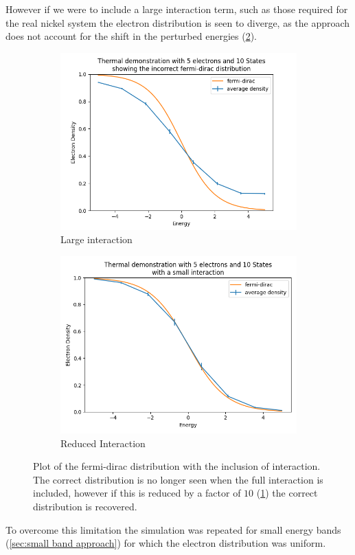 However if we were to include
a large interaction term, such
as those required for the
real nickel system the
electron distribution is
seen to diverge, as the approach
does not account for the
shift in the perturbed
energies (\cref{fig:incorrect fermi dirac}).
\begin{figure}[htbp]
    \centering
    \begin{subfigure}{0.45\linewidth}
        \centering
        \includegraphics[width =0.9 \linewidth]{Figures/Simulation/Plot of incorrect fermi dirac distribution on center.png}
        \caption{Large interaction}
    \end{subfigure}
    \hfill
    \begin{subfigure}{0.45\linewidth}
        \centering
        \includegraphics[width = 0.9\linewidth]{Figures/Simulation/Plot of incorrect fermi dirac distribution on center small interaction.png}
        \caption{Reduced Interaction}\label{sub@fig:reduced interaction fermi-dirac}
    \end{subfigure}
    \caption{Plot of the fermi-dirac distribution
        with the inclusion of interaction. The
        correct distribution is no longer seen when
        the full interaction is included, however
        if this is reduced by a factor of \(10\)
        (\cref{sub@fig:reduced interaction fermi-dirac})
        the correct distribution is recovered.}\label{fig:incorrect fermi dirac}
\end{figure}
To overcome this limitation
the simulation was repeated
for small energy bands (\cref{sec:small band approach})
for which the electron distribution
was uniform.

